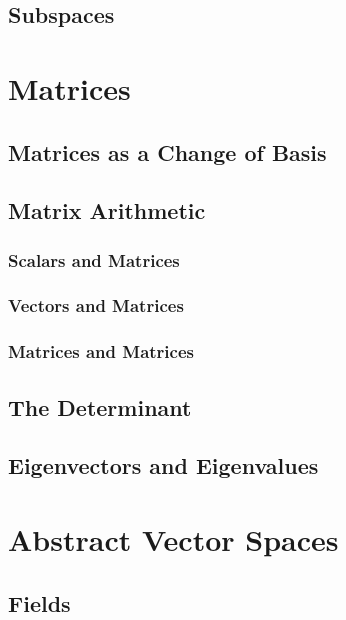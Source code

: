\documentclass[cm, 10pt, titlepage, oneside]{book}
\begin{document}
  \section{Subspaces}

\chapter{Matrices}
  \section{Matrices as a Change of Basis}
  \section{Matrix Arithmetic}
    \subsection{Scalars and Matrices}
    \subsection{Vectors and Matrices}
    \subsection{Matrices and Matrices}
  \section{The Determinant}
  \section{Eigenvectors and Eigenvalues}

\chapter{Abstract Vector Spaces}
  \section{Fields}
\end{document}
